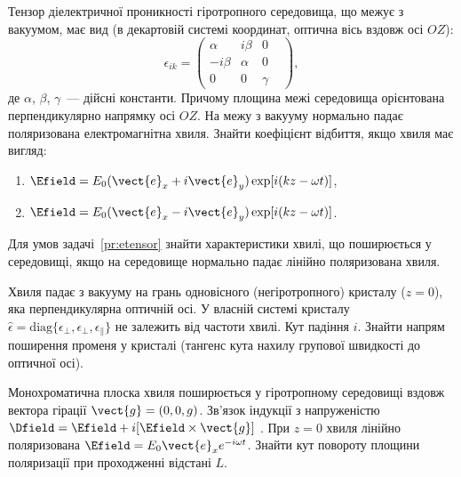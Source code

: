 \begin{problem}\label{pr:etensor}
Тензор діелектричної проникності гіротропного середовища, що межує з вакуумом, має вид (в декартовій системі координат, оптична вісь вздовж осі $OZ$):
\begin{equation}\label{eq:etensor}
	\epsilon_{ik}  = \left( {\begin{array}{*{20}{c}}
			\alpha       & {i\beta } & 0      & \\
			{ - i\beta } & \alpha    & 0      & \\
			0            & 0         & \gamma &
		\end{array}} \right),
\end{equation}
де $\alpha$, $\beta$, $\gamma$~--- дійсні константи. Причому площина межі середовища орієнтована перпендикулярно напрямку осі $OZ$. На межу з вакууму нормально падає поляризована електромагнітна хвиля. Знайти коефіцієнт відбиття, якщо хвиля має вигляд:
\begin{enumerate}[label=\alph*)]
	\item $\Efield = E_0(\vect{e}_x + i\vect{e}_y)\exp [i(kz - \omega t)]$,
	\item $\Efield = E_0(\vect{e}_x - i\vect{e}_y)\exp [i(kz - \omega t)]$.
\end{enumerate}
\end{problem}

\begin{problem}
Для умов задачі~\ref{pr:etensor} знайти характеристики хвилі, що поширюється у середовищі, якщо на середовище нормально падає лінійно поляризована хвиля.
\end{problem}

\begin{problem}
Хвиля падає з вакууму на грань одновісного (негіротропного) кристалу ($z = 0$), яка перпендикулярна оптичній осі. У власній системі кристалу $\hat{\epsilon} = \mathrm{diag}\{\epsilon_\bot, \epsilon_\bot, \epsilon_\parallel\}$  не залежить від частоти хвилі. Кут падіння $i$. Знайти напрям поширення променя у кристалі (тангенс кута нахилу групової швидкості до оптичної осі).
\end{problem}

\begin{problem}
Монохроматична плоска хвиля поширюється у гіротропному середовищі вздовж вектора гірації $\vect{g} = (0,0,g)$. Зв’язок індукції з напруженістю $\Dfield = \Efield + i[\Efield \times \vect{g} ]$ . При $z= 0$ хвиля лінійно поляризована $\Efield = E_0\vect{e}_x e^{- i\omega t}$. Знайти кут повороту площини поляризації при проходженні відстані $L$.
\end{problem}

